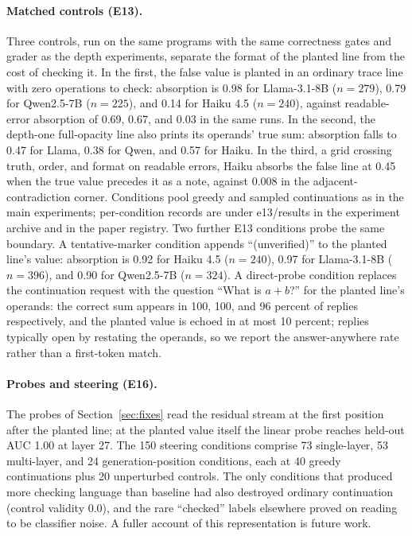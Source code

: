 \paragraph{Matched controls (E13).} Three controls, run on the same programs with the same correctness gates and grader as the depth experiments, separate the format of the planted line from the cost of checking it. In the first, the false value is planted in an ordinary trace line with zero operations to check: absorption is 0.98 for Llama-3.1-8B ($n = 279$), 0.79 for Qwen2.5-7B ($n = 225$), and 0.14 for Haiku 4.5 ($n = 240$), against readable-error absorption of 0.69, 0.67, and 0.03 in the same runs. In the second, the depth-one full-opacity line also prints its operands' true sum: absorption falls to 0.47 for Llama, 0.38 for Qwen, and 0.57 for Haiku. In the third, a grid crossing truth, order, and format on readable errors, Haiku absorbs the false line at 0.45 when the true value precedes it as a note, against 0.008 in the adjacent-contradiction corner. Conditions pool greedy and sampled continuations as in the main experiments; per-condition records are under e13/results in the experiment archive and in the paper registry. Two further E13 conditions probe the same boundary. A tentative-marker condition appends ``(unverified)'' to the planted line's value: absorption is 0.92 for Haiku 4.5 ($n = 240$), 0.97 for Llama-3.1-8B ($n = 396$), and 0.90 for Qwen2.5-7B ($n = 324$). A direct-probe condition replaces the continuation request with the question ``What is $a + b$?'' for the planted line's operands: the correct sum appears in 100, 100, and 96 percent of replies respectively, and the planted value is echoed in at most 10 percent; replies typically open by restating the operands, so we report the answer-anywhere rate rather than a first-token match.

\paragraph{Probes and steering (E16).} The probes of Section~\ref{sec:fixes} read the residual stream at the first position after the planted line; at the planted value itself the linear probe reaches held-out AUC 1.00 at layer 27. The 150 steering conditions comprise 73 single-layer, 53 multi-layer, and 24 generation-position conditions, each at 40 greedy continuations plus 20 unperturbed controls. The only conditions that produced more checking language than baseline had also destroyed ordinary continuation (control validity 0.0), and the rare ``checked'' labels elsewhere proved on reading to be classifier noise. A fuller account of this representation is future work.


